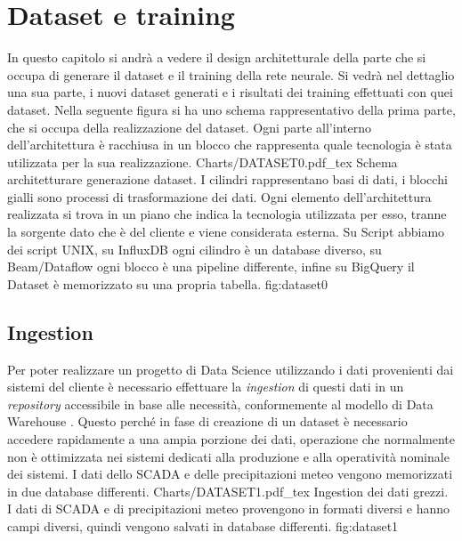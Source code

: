 \chapter{Dataset e training} \label{dataset}
In questo capitolo si andrà a vedere il design architetturale della parte che si occupa di generare il dataset e il training della rete neurale. Si vedrà nel dettaglio una sua parte, i nuovi dataset generati e i risultati dei training effettuati con quei dataset. Nella seguente figura si ha uno schema rappresentativo della prima parte, che si occupa della realizzazione del dataset. Ogni parte all’interno dell’architettura è racchiusa in un blocco che rappresenta quale tecnologia è stata utilizzata per la sua realizzazione.
\svg
{Charts/DATASET0.pdf_tex}
{Schema architetturare generazione dataset. I cilindri rappresentano basi di dati, i blocchi gialli sono processi di trasformazione dei dati. Ogni elemento dell'architettura realizzata si trova in un piano che indica la tecnologia utilizzata per esso, tranne la sorgente dato che è del cliente e viene considerata esterna. Su Script abbiamo dei script UNIX, su InfluxDB ogni cilindro è un database diverso, su Beam/Dataflow ogni blocco è una pipeline differente, infine su BigQuery il Dataset è memorizzato su una propria tabella. }
{fig:dataset0}
\section{Ingestion}\label{ingestion}
Per poter realizzare un progetto di Data Science utilizzando i dati provenienti dai sistemi del cliente è necessario effettuare la \textit{ingestion} di questi dati in un \textit{repository} accessibile in base alle necessità, conformemente al modello di Data Warehouse \cite{kimball_ross_2013}. Questo perché in fase di creazione di un dataset è necessario accedere rapidamente a una ampia porzione dei dati, operazione che normalmente non è ottimizzata nei sistemi dedicati alla produzione e alla operatività nominale dei sistemi. I dati dello SCADA e delle precipitazioni meteo vengono memorizzati in due database differenti.
\svg
{Charts/DATASET1.pdf_tex}
{Ingestion dei dati grezzi. I dati di SCADA e di precipitazioni meteo provengono in formati diversi e hanno campi diversi, quindi vengono salvati in database differenti.}
{fig:dataset1}
